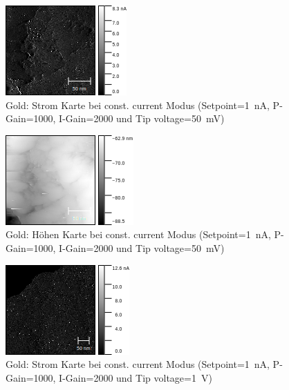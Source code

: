 \documentclass[sn-mathphys-num,iicol]{sn-jnl}
\theoremstyle{thmstyleone}
\theoremstyle{thmstyletwo}
\theoremstyle{thmstylethree}
\begin{document}
\begin{figure}[t]
        \centering
        \includegraphics[width=.5\textwidth]{../data/Gold_200nm_50mV_current.png}
        \caption{Gold: Strom Karte bei const. current Modus (Setpoint=\SI{1}{\nano A}, P-Gain=\SI{1000}{}, I-Gain=\SI{2000}{} und Tip voltage=\SI{50}{\milli V})} \label{fig:g200nm50mVc}
\end{figure}
\begin{figure}[t]
        \centering
        \includegraphics[width=.5\textwidth]{../data/Gold_200nm_50mV_z.png}
        \caption{Gold: Höhen Karte bei const. current Modus (Setpoint=\SI{1}{\nano A}, P-Gain=\SI{1000}{}, I-Gain=\SI{2000}{} und Tip voltage=\SI{50}{\milli V})} \label{fig:g200nm50mVz}
\end{figure}
\begin{figure}[t]
        \centering
        \includegraphics[width=.5\textwidth]{../data/Gold_400nm_current.png}
        \caption{Gold: Strom Karte bei const. current Modus (Setpoint=\SI{1}{\nano A}, P-Gain=\SI{1000}{}, I-Gain=\SI{2000}{} und Tip voltage=\SI{1}{V})} \label{fig:g400nmc}
\end{figure}
\end{document}
